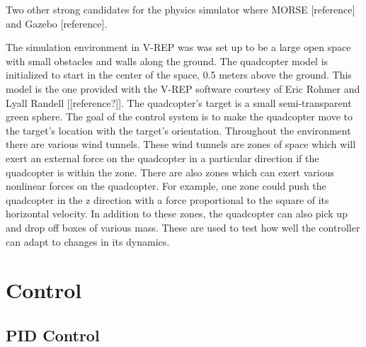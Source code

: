 \documentclass[letterpaper,12pt,titlepage,oneside,final]{book}
\begin{document}
Two other strong candidates for the physics simulator where MORSE [reference] and Gazebo [reference]. 


The simulation environment in V-REP was was set up to be a large open space with small obstacles and walls along the ground. 
The quadcopter model is initialized to start in the center of the space, 0.5 meters above the ground. 
This model is the one provided with the V-REP software courtesy of Eric Rohmer and Lyall Randell [[reference?]]. 
The quadcopter’s target is a small semi-transparent green sphere. The goal of the control system is to make the quadcopter move to the target’s location with the target’s orientation. 
Throughout the environment there are various wind tunnels. 
These wind tunnels are zones of space which will exert an external force on the quadcopter in a particular direction if the quadcopter is within the zone. 
There are also zones which can exert various nonlinear forces on the quadcopter. 
For example, one zone could push the quadcopter in the z direction with a force proportional to the square of its horizontal velocity. 
In addition to these zones, the quadcopter can also pick up and drop off boxes of various mass. 
These are used to test how well the controller can adapt to changes in its dynamics.

\chapter{Control} \label{chap:control}

\section{PID Control}

\end{document}

